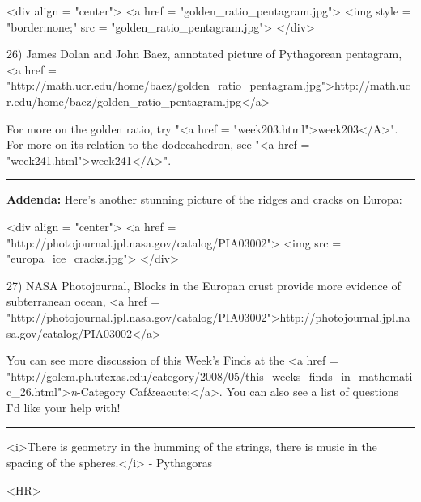 <div align = "center">
<a href = "golden_ratio_pentagram.jpg">
<img style = "border:none;" src = "golden_ratio_pentagram.jpg">
</div>

26) James Dolan and John Baez, annotated picture of Pythagorean 
pentagram, <a href = "http://math.ucr.edu/home/baez/golden_ratio_pentagram.jpg">http://math.ucr.edu/home/baez/golden_ratio_pentagram.jpg</a>

For more on the golden ratio, try "<a href = "week203.html">week203</A>".  For more on its 
relation to the dodecahedron, see "<a href = "week241.html">week241</A>".

\par\noindent\rule{\textwidth}{0.4pt}
\textbf{Addenda:}
Here's another stunning picture of the ridges and cracks on Europa:

<div align = "center">
<a href = "http://photojournal.jpl.nasa.gov/catalog/PIA03002">
<img src = "europa_ice_cracks.jpg">
</div>

27) NASA Photojournal, Blocks in the Europan crust provide
more evidence of subterranean ocean, <a href = "http://photojournal.jpl.nasa.gov/catalog/PIA03002">http://photojournal.jpl.nasa.gov/catalog/PIA03002</a>

You can see more discussion of this Week's Finds at the <a href =
"http://golem.ph.utexas.edu/category/2008/05/this_weeks_finds_in_mathematic_26.html">\emph{n}-Category
Caf&eacute;</a>.  You can also see a list of questions I'd like your
help with!



\par\noindent\rule{\textwidth}{0.4pt}
<i>There is geometry in the humming of the strings, there is music in
the spacing of the spheres.</i> - Pythagoras

<HR>



